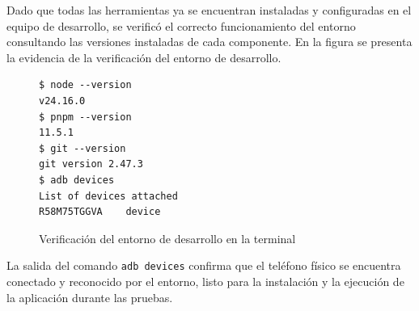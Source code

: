 \begin{table}[H]
  \centering
  \caption{Elementos del entorno de desarrollo}
\end{table}

Dado que todas las herramientas ya se encuentran instaladas y configuradas en
el equipo de desarrollo, se verific\'o el correcto funcionamiento del entorno
consultando las versiones instaladas de cada componente. En la figura se
presenta la evidencia de la verificaci\'on del entorno de desarrollo.

\begin{figure}[H]
\centering
  \caption{Verificaci\'on del entorno de desarrollo en la terminal}
  \label{fig:entorno-desarrollo}
  \vspace{6pt}
  \begin{lstlisting}[style=terminal]
$ node --version
v24.16.0
$ pnpm --version
11.5.1
$ git --version
git version 2.47.3
$ adb devices
List of devices attached
R58M75TGGVA    device
  \end{lstlisting}
  \par\raggedright{}\end{figure}

La salida del comando \texttt{adb devices} confirma que el tel\'efono f\'isico
se encuentra conectado y reconocido por el entorno, listo para la instalaci\'on
y la ejecuci\'on de la aplicaci\'on durante las pruebas.
